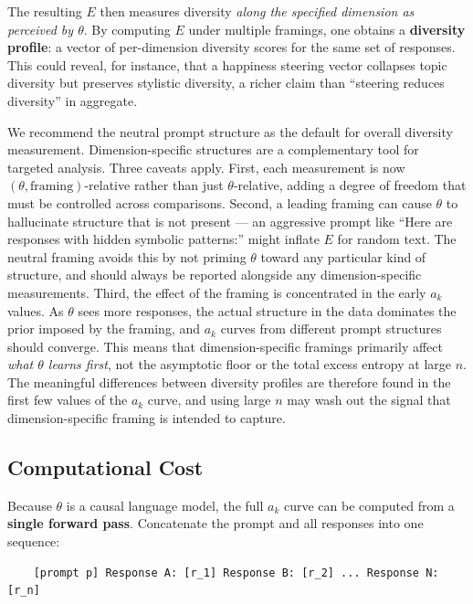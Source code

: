 \documentclass[11pt]{article}
\begin{document}
The resulting $E$ then measures diversity \emph{along the specified dimension as perceived by $\theta$}. By computing $E$ under multiple framings, one obtains a \textbf{diversity profile}: a vector of per-dimension diversity scores for the same set of responses. This could reveal, for instance, that a happiness steering vector collapses topic diversity but preserves stylistic diversity, a richer claim than ``steering reduces diversity'' in aggregate.

We recommend the neutral prompt structure as the default for overall diversity measurement. Dimension-specific structures are a complementary tool for targeted analysis. Three caveats apply. First, each measurement is now $(\theta, \text{framing})$-relative rather than just $\theta$-relative, adding a degree of freedom that must be controlled across comparisons. Second, a leading framing can cause $\theta$ to hallucinate structure that is not present --- an aggressive prompt like ``Here are responses with hidden symbolic patterns:'' might inflate $E$ for random text. The neutral framing avoids this by not priming $\theta$ toward any particular kind of structure, and should always be reported alongside any dimension-specific measurements. Third, the effect of the framing is concentrated in the early $a_k$ values. As $\theta$ sees more responses, the actual structure in the data dominates the prior imposed by the framing, and $a_k$ curves from different prompt structures should converge. This means that dimension-specific framings primarily affect \emph{what $\theta$ learns first}, not the asymptotic floor or the total excess entropy at large $n$. The meaningful differences between diversity profiles are therefore found in the first few values of the $a_k$ curve, and using large $n$ may wash out the signal that dimension-specific framing is intended to capture.

\subsection{Computational Cost}\label{sec:cost}

Because $\theta$ is a causal language model, the full $a_k$ curve can be computed from a \textbf{single forward pass}. Concatenate the prompt and all responses into one sequence:

\begin{verbatim}
    [prompt p] Response A: [r_1] Response B: [r_2] ... Response N: [r_n]
\end{verbatim}
\end{document}
